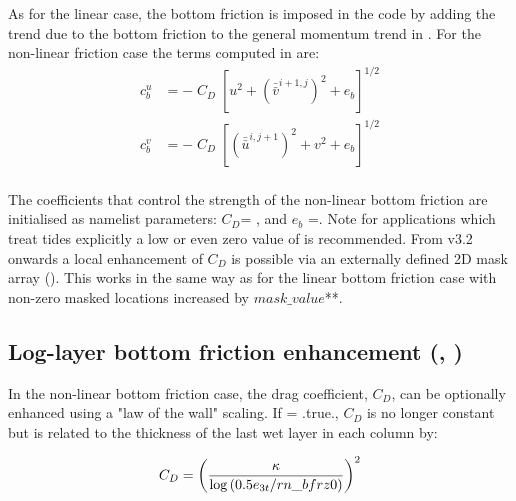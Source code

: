 \documentclass[../tex_main/NEMO_manual]{subfiles}
\begin{document}
As for the linear case, the bottom friction is imposed in the code by 
adding the trend due to the bottom friction to the general momentum trend 
in .
For the non-linear friction case the terms
computed in   are: 
\begin{equation} \label{eq:zdfbfr_nonlinbfr}
\begin{split}
 c_b^u &= - \; C_D\;\left[ u^2 + \left(\bar{\bar{v}}^{i+1,j}\right)^2 + e_b \right]^{1/2}\\
 c_b^v &= - \; C_D\;\left[  \left(\bar{\bar{u}}^{i,j+1}\right)^2 + v^2 + e_b \right]^{1/2}\\
\end{split}
\end{equation}

The coefficients that control the strength of the non-linear bottom friction are
initialised as namelist parameters: $C_D$= , and $e_b$ =.
Note for applications which treat tides explicitly a low or even zero value of
 is recommended. From v3.2 onwards a local enhancement of $C_D$ is possible
via an externally defined 2D mask array ().  This works in the same way
as for the linear bottom friction case with non-zero masked locations increased by
$mask\_value$**.

\subsection[Log-layer btm frict enhncmnt (\protect\np{nn\_botfr}\forcode{ = 2}, \protect\np{ln\_loglayer}\forcode{ = .true.})]
				{Log-layer bottom friction enhancement (\protect{}, \protect{})}
\label{subsec:ZDF_bfr_loglayer}

In the non-linear bottom friction case, the drag coefficient, $C_D$, can be optionally
enhanced using a "law of the wall" scaling. If   = .true., $C_D$ is no
longer constant but is related to the thickness of the last wet layer in each column by:

\begin{equation}
C_D = \left ( {\kappa \over {\rm log}\left ( 0.5e_{3t}/rn\_bfrz0 \right ) } \right )^2
\end{equation}
\end{document}
